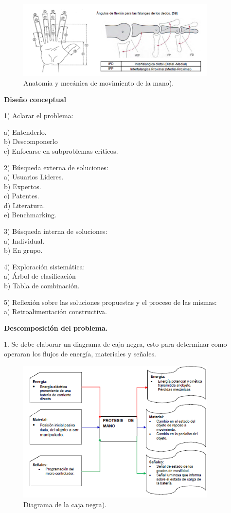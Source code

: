 \documentclass{article}
\begin{document}
\begin{figure}[H] %
    \centering
    \includegraphics[width=100mm]{anatomia y mecanida de movimiento.png} %
    \caption{Anatomía y mecánica de movimiento de la mano)\cite{ff5}.}
    \label{grafica:ocho}
\end{figure}

\textbf{Diseño conceptual} 

1)	Aclarar el problema:

a)	Entenderlo.
\\b)	Descomponerlo
\\c)	Enfocarse en subproblemas críticos.


2)	Búsqueda externa de soluciones:
\\a)	Usuarios Líderes.
\\b)	Expertos.
\\c)	Patentes.
\\d)	Literatura.
\\e)	Benchmarking.


3)	Búsqueda interna de soluciones:
\\a)	Individual.
\\b)	En grupo.


4)	Exploración sistemática:
\\a)	Árbol de clasificación
\\b)	Tabla de combinación.


5)	Reflexión sobre las soluciones propuestas y el proceso de las mismas:
\\a)	Retroalimentación constructiva\cite{ff5}.


\textbf{Descomposición del problema.} 


1. Se debe elaborar un diagrama de caja negra, esto para determinar como operaran los flujos de energía, materiales y señales.

\begin{figure}[H] %
    \centering
    \includegraphics[width=100mm]{diagrama de la caja negra.png} %
    \caption{Diagrama de la caja negra)\cite{ff5}.}
    \label{grafica:nueve}
\end{figure}
\end{document}
